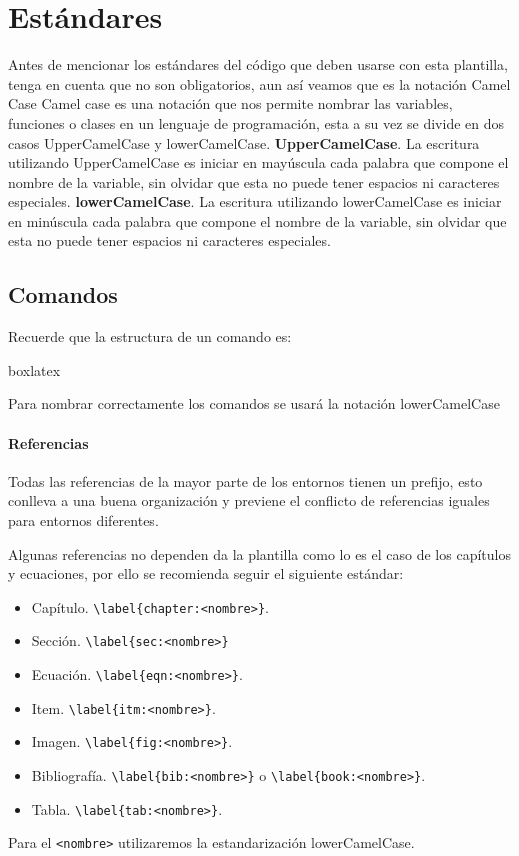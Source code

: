 \chapter{Estándares}\label{cap:estandares}
Antes de mencionar los estándares del código que deben usarse con esta plantilla, tenga en cuenta que no son obligatorios, aun así veamos que es la notación Camel Case\pap 
Camel case es una notación que nos permite nombrar las variables, funciones o clases en un lenguaje de programación, esta a su vez se divide en dos casos UpperCamelCase y lowerCamelCase.\pap
\textbf{UpperCamelCase}.
La escritura utilizando UpperCamelCase es iniciar en mayúscula cada palabra que compone el nombre de la variable, sin olvidar que esta no puede tener espacios ni caracteres especiales.\pap 
\textbf{lowerCamelCase}.
La escritura utilizando lowerCamelCase es iniciar en minúscula cada palabra que compone el nombre de la variable, sin olvidar que esta no puede tener espacios ni caracteres especiales.
\section{Comandos}
Recuerde que la estructura de un comando es:
\begin{center}
	\begin{tcblisting}{boxlatex}
		\newcommand{\nombreDeComando}[<arguments number>]{<function>}
	\end{tcblisting}
\end{center}
Para nombrar correctamente los comandos se usará la notación lowerCamelCase
\subsubsection{Referencias}
Todas las referencias de la mayor parte de los entornos tienen un prefijo, esto conlleva a una buena organización y previene el conflicto de referencias iguales para entornos diferentes.
\begin{freebox}[Convención]
	Algunas referencias no dependen da la plantilla como lo es el caso de los capítulos y ecuaciones, por ello se recomienda seguir el siguiente  estándar: 
	\begin{itemize}
		\item Capítulo. \verb|\label{chapter:<nombre>}|.
		\item Sección. \verb|\label{sec:<nombre>}|
		\item Ecuación. \verb|\label{eqn:<nombre>}|.
		\item Item. \verb|\label{itm:<nombre>}|.
		\item Imagen. \verb|\label{fig:<nombre>}|.
		\item Bibliografía. \verb|\label{bib:<nombre>}| o \verb|\label{book:<nombre>}|.
		\item Tabla. \verb|\label{tab:<nombre>}|.
	\end{itemize}
	\begin{freebox}[Nota]
		Para el \verb|<nombre>| utilizaremos la estandarización lowerCamelCase. 
	\end{freebox}
\end{freebox}
